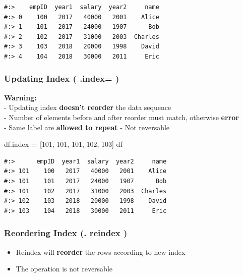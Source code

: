 \documentclass[
]{book}
\newenvironment{Shaded}{\begin{snugshade}}{\end{snugshade}}
\newcommand{\DecValTok}[1]{\textcolor[rgb]{0.06,0.06,0.06}{#1}}
\newcommand{\NormalTok}[1]{#1}
\newcommand{\OperatorTok}[1]{\textcolor[rgb]{0.43,0.43,0.43}{\textbf{#1}}}
\providecommand{\tightlist}{%
  \setlength{\itemsep}{0pt}\setlength{\parskip}{0pt}}
\begin{document}
\begin{verbatim}
#:>    empID  year1  salary  year2     name
#:> 0    100   2017   40000   2001    Alice
#:> 1    101   2017   24000   1907      Bob
#:> 2    102   2017   31000   2003  Charles
#:> 3    103   2018   20000   1998    David
#:> 4    104   2018   30000   2011     Eric
\end{verbatim}

\hypertarget{updating-index-.index}{%
\subsubsection{Updating Index ( .index= )}\label{updating-index-.index}}

\textbf{Warning:}\\
- Updating index \textbf{doesn't reorder} the data sequence\\
- Number of elements before and after reorder must match, otherwise \textbf{error}\\
- Same label are \textbf{allowed to repeat} - Not reversable

\begin{Shaded}
\begin{Highlighting}[]
\NormalTok{df.index }\OperatorTok{=}\NormalTok{ [}\DecValTok{101}\NormalTok{, }\DecValTok{101}\NormalTok{, }\DecValTok{101}\NormalTok{, }\DecValTok{102}\NormalTok{, }\DecValTok{103}\NormalTok{]}
\NormalTok{df}
\end{Highlighting}
\end{Shaded}

\begin{verbatim}
#:>      empID  year1  salary  year2     name
#:> 101    100   2017   40000   2001    Alice
#:> 101    101   2017   24000   1907      Bob
#:> 101    102   2017   31000   2003  Charles
#:> 102    103   2018   20000   1998    David
#:> 103    104   2018   30000   2011     Eric
\end{verbatim}

\hypertarget{reordering-index-.-reindex}{%
\subsubsection{Reordering Index (. reindex )}\label{reordering-index-.-reindex}}

\begin{itemize}
\tightlist
\item
  Reindex will \textbf{reorder} the rows according to new index\\
\item
  The operation is not reversable
\end{itemize}
\end{document}
